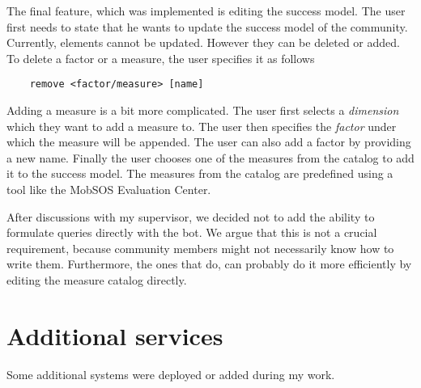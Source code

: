 The final feature, which was implemented is editing the success model. The user first needs to state that he wants to update the success model of the community.
Currently, elements cannot be updated. 
However they can be deleted or added. 
To delete a factor or a measure, the user specifies it as follows \begin{lstlisting}
    remove <factor/measure> [name]
\end{lstlisting}  
Adding a measure is a bit more complicated. The user first selects a \emph{dimension} which they want to add a measure to. The user then specifies the \emph{factor} under which the measure will be appended. The user can also add a factor by providing a new name. Finally the user chooses one of the measures from the catalog to add it to the success model. 
The measures from the catalog are predefined using a tool like the MobSOS Evaluation Center. 

After discussions with my supervisor, we decided not to add the ability to formulate queries directly with the bot. 
We argue that this is not a crucial requirement, because community members might not necessarily know how to write them. Furthermore, the ones that do, can probably do it more efficiently by editing the measure catalog directly.




\section{Additional services}\label{sec:additional}
Some additional systems were deployed or added during my work.

